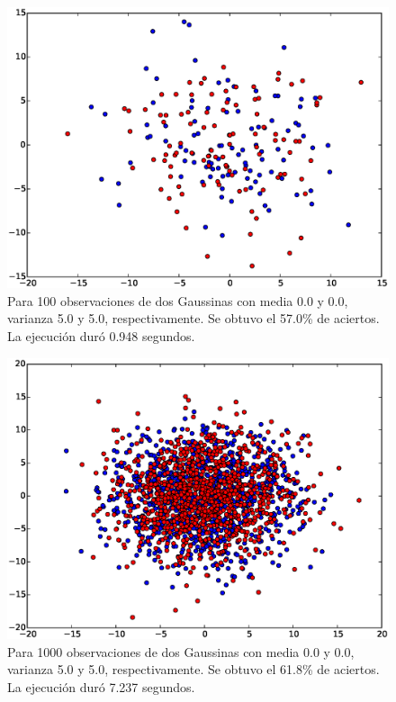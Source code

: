 \documentclass[11pt,letterpaper,reqno]{article}
\begin{document}
\begin{figure}[h]
	\centering
	\includegraphics[scale=.5]{img5}
	\caption{Para 100 observaciones de dos Gaussinas con media 0.0 y 0.0, varianza 5.0 y 5.0, respectivamente. Se obtuvo el 57.0\% de aciertos. La ejecución duró 0.948 segundos.}
\end{figure}

\begin{figure}[h]
	\centering
	\includegraphics[scale=.5]{img6}
	\caption{Para 1000 observaciones de dos Gaussinas con media 0.0 y 0.0, varianza 5.0 y 5.0, respectivamente. Se obtuvo el 61.8\% de aciertos. La ejecución duró 7.237 segundos.}
\end{figure}
\end{document}

